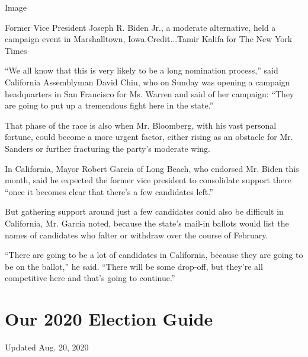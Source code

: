 Image

Former Vice President Joseph R. Biden Jr., a moderate alternative, held
a campaign event in Marshalltown, Iowa.Credit...Tamir Kalifa for The New
York Times

``We all know that this is very likely to be a long nomination
process,'' said California Assemblyman David Chiu, who on Sunday was
opening a campaign headquarters in San Francisco for Ms. Warren and said
of her campaign: ``They are going to put up a tremendous fight here in
the state.''

That phase of the race is also when Mr. Bloomberg, with his vast
personal fortune, could become a more urgent factor, either rising as an
obstacle for Mr. Sanders or further fracturing the party's moderate
wing.

In California, Mayor Robert Garcia of Long Beach, who endorsed Mr. Biden
this month, said he expected the former vice president to consolidate
support there ``once it becomes clear that there's a few candidates
left.''

But gathering support around just a few candidates could also be
difficult in California, Mr. Garcia noted, because the state's mail-in
ballots would list the names of candidates who falter or withdraw over
the course of February.

``There are going to be a lot of candidates in California, because they
are going to be on the ballot,'' he said. ``There will be some drop-off,
but they're all competitive here and that's going to continue.''

\hypertarget{our-2020-election-guide}{%
\section{Our 2020 Election Guide}\label{our-2020-election-guide}}

Updated Aug. 20, 2020

